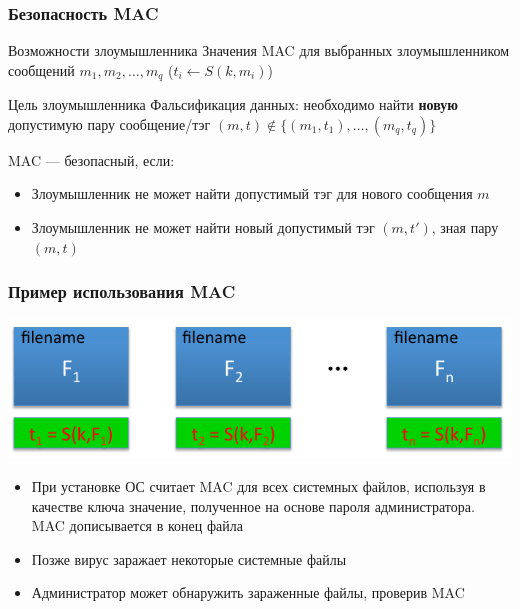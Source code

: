 \documentclass{beamer}
\newcommand{\set}[1]{{\lbrace #1 \rbrace}}
\begin{document}
\begin{frame}
  \frametitle{Безопасность MAC}

  \begin{block}{Возможности злоумышленника}
    Значения MAC для выбранных злоумышленником сообщений $m_{1},m_{2},\ldots,m_{q}$ 
     ($t_{i} \leftarrow S(k,m_{i})$)
  \end{block}

  \begin{block}{Цель злоумышленника}
    Фальсификация данных:
    необходимо найти \textbf{новую} допустимую пару сообщение/тэг
    $(m,t) \notin \set{(m_{1}, t_{1}),\ldots,(m_{q}, t_{q})}$
  \end{block}

  \begin{block}{MAC --- безопасный, если:}
    \begin{itemize}
      \item{Злоумышленник не может найти допустимый тэг для нового сообщения $m$}
      \item{Злоумышленник не может найти новый допустимый тэг $(m, t')$, зная пару $(m,t)$}
    \end{itemize}
  \end{block}
  
\end{frame}


\begin{frame}
  \frametitle{Пример использования MAC}

  \includegraphics[width=\linewidth]{./images/png/MAC_example_FS.png}
  
  \begin{itemize}
    \item{При установке ОС считает MAC для всех системных файлов, используя в качестве
      ключа значение, полученное на основе пароля администратора. MAC дописывается в конец файла}
    \item{Позже вирус заражает некоторые системные файлы}
    \item{Администратор может обнаружить зараженные файлы, проверив MAC}
  \end{itemize}
\end{frame}
\end{document}

